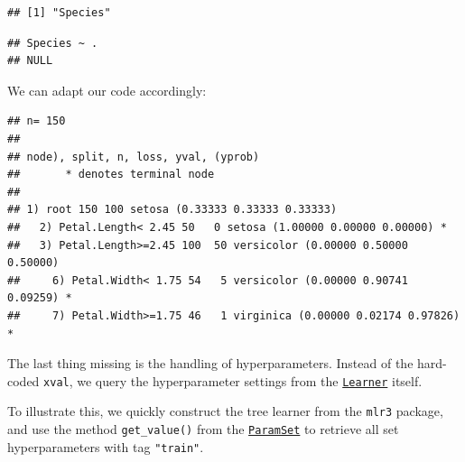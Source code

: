 \documentclass[]{scrbook}
\newenvironment{Shaded}{\begin{snugshade}}{\end{snugshade}}
\newcommand{\DataTypeTok}[1]{\textcolor[rgb]{0.13,0.29,0.53}{#1}}
\newcommand{\DecValTok}[1]{\textcolor[rgb]{0.00,0.00,0.81}{#1}}
\newcommand{\KeywordTok}[1]{\textcolor[rgb]{0.13,0.29,0.53}{\textbf{#1}}}
\newcommand{\NormalTok}[1]{#1}
\newcommand{\OperatorTok}[1]{\textcolor[rgb]{0.81,0.36,0.00}{\textbf{#1}}}
\newcommand{\StringTok}[1]{\textcolor[rgb]{0.31,0.60,0.02}{#1}}
\renewenvironment{Shaded} {\begin{snugshade}\small} {\end{snugshade}}
\begin{document}
\begin{verbatim}
## [1] "Species"
\end{verbatim}

\begin{Shaded}
\end{Shaded}

\begin{verbatim}
## Species ~ .
## NULL
\end{verbatim}

We can adapt our code accordingly:

\begin{Shaded}
\end{Shaded}

\begin{verbatim}
## n= 150 
## 
## node), split, n, loss, yval, (yprob)
##       * denotes terminal node
## 
## 1) root 150 100 setosa (0.33333 0.33333 0.33333)  
##   2) Petal.Length< 2.45 50   0 setosa (1.00000 0.00000 0.00000) *
##   3) Petal.Length>=2.45 100  50 versicolor (0.00000 0.50000 0.50000)  
##     6) Petal.Width< 1.75 54   5 versicolor (0.00000 0.90741 0.09259) *
##     7) Petal.Width>=1.75 46   1 virginica (0.00000 0.02174 0.97826) *
\end{verbatim}

The last thing missing is the handling of hyperparameters.
Instead of the hard-coded \texttt{xval}, we query the hyperparameter settings from the \href{https://mlr3.mlr-org.com/reference/Learner.html}{\texttt{Learner}} itself.

To illustrate this, we quickly construct the tree learner from the \texttt{mlr3} package, and use the method \texttt{get\_value()} from the \href{https://paradox.mlr-org.com/reference/ParamSet.html}{\texttt{ParamSet}} to retrieve all set hyperparameters with tag \texttt{"train"}.

\begin{Shaded}
\end{Shaded}
\end{document}
